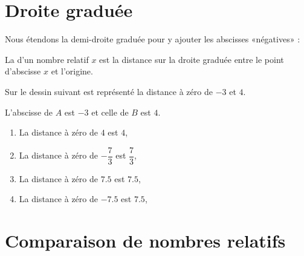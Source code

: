 
\section{Droite graduée}


Nous étendons la demi-droite graduée pour y ajouter les abscisses «négatives» :
\begin{center}
    
\end{center}

\begin{definition}
    La  d'un nombre relatif \( x\) est la distance sur la droite graduée entre le point d'abscisse \( x\) et l'origine.
\end{definition}

\begin{example}
    Sur le dessin suivant est représenté la distance à zéro de \( -3\) et \( 4\).
    \begin{center}
        
    \end{center}
    L'abscisse de \( A\) est \( -3\) et celle de \( B\) est \( 4\).
\end{example}

\begin{example}
    \begin{enumerate}
        \item
            La distance à zéro de \( 4\) est \( 4\),
        \item
            La distance à zéro de \( -\dfrac{ 7 }{ 3 }\) est \( \dfrac{ 7 }{ 3 }\),
        \item
            La distance à zéro de \( 7.5\) est \( 7.5\),
        \item
            La distance à zéro de \( -7.5 \) est \( 7.5\),
    \end{enumerate}
\end{example}



\section{Comparaison de nombres relatifs}

